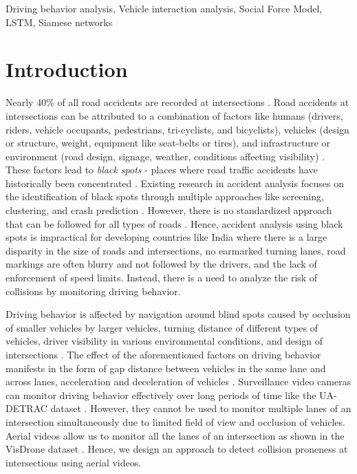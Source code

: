 \documentclass[final,journal]{IEEEtran}
\begin{document}
\begin{IEEEkeywords}
Driving behavior analysis, Vehicle interaction analysis, Social Force Model, LSTM, Siamese networks
\end{IEEEkeywords}

\IEEEpeerreviewmaketitle
\section{Introduction}
Nearly 40\% of all road accidents are recorded at intersections \cite{intersection_crash_report}. Road accidents at intersections can be attributed to a combination of factors like humans (drivers, riders, vehicle occupants, pedestrians, tri-cyclists, and bicyclists), vehicles (design or structure, weight, equipment like seat-belts or tires), and infrastructure or environment (road design, signage, weather, conditions affecting visibility) \cite{roadsafetyreview,statistical1,statistical2}. These factors lead to \textit{black spots} - places where road traffic accidents have historically been concentrated \cite{blackspot1, blackspot2}. Existing research in accident analysis focuses on the identification of black spots through multiple approaches like screening, clustering, and crash prediction \cite{blackspot3}. However, there is no standardized approach that can be followed for all types of roads \cite{blackspot4}. Hence, accident analysis using black spots is impractical for developing countries like India where there is a large disparity in the size of roads and intersections, no earmarked turning lanes, road markings are often blurry and not followed by the drivers, and the lack of enforcement of speed limits. Instead, there is a need to analyze the risk of collisions by monitoring driving behavior.

Driving behavior is affected by navigation around blind spots caused by occlusion of smaller vehicles by larger vehicles, turning distance of different types of vehicles, driver visibility in various environmental conditions, and design of intersections \cite{drivingsurvey}. The effect of the aforementioned factors on  driving behavior manifests in the form of gap distance between vehicles in the same lane and across lanes, acceleration and deceleration of vehicles \cite{drivingsurvey}. Surveillance video cameras can monitor driving behavior effectively over long periods of time like the UA-DETRAC dataset \cite{ua-detrac}. However, they cannot be used to monitor multiple lanes of an intersection simultaneously due to limited field of view and occlusion of vehicles. Aerial videos allow us to monitor all the lanes of an intersection as shown in the VisDrone dataset \cite{datafromsky}. Hence, we design an approach to detect collision proneness at intersections using aerial videos. 
\end{document}
